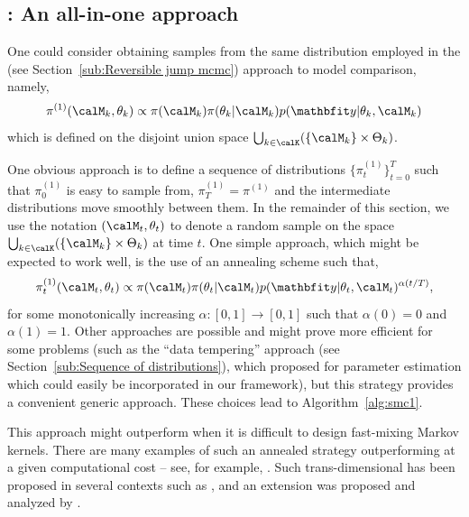 \subsection[SMC1: An all-in-on approach]{\smc[1]: An all-in-one approach}
\label{sub:smc1: An all-in-one approach}

One could consider obtaining samples from the same distribution employed in
the \rjmcmc (see Section~\ref{sub:Reversible jump mcmc}) approach to model
comparison, namely,
\begin{equation}
  \pi^{(1)}(\calM_k,\theta_k) \propto
  \pi(\calM_k)\pi(\theta_k|\calM_k)p(\data|\theta_k,\calM_k)
\end{equation}
which is defined on the disjoint union space
$\bigcup_{k\in\calK}(\{\calM_k\}\times\Theta_k)$.

One obvious \smc approach is to define a sequence of distributions
$\{\pi_t^{(1)}\}_{t=0}^T$ such that $\pi^{(1)}_0$ is easy to sample from,
$\pi_{T}^{(1)} = \pi^{(1)}$ and the intermediate distributions move smoothly
between them. In the remainder of this section, we use the notation
$(\calM_t,\theta_t)$ to denote a random sample on the space
$\bigcup_{k\in\calK}(\{\calM_k\}\times\Theta_k)$ at time $t$. One simple
approach, which might be expected to work well, is the use of an annealing
scheme such that,
\begin{equation}
  \pi^{(1)}_t(\calM_t,\theta_t) \propto \pi(\calM_t)\pi(\theta_t|\calM_t)
  p(\data|\theta_t,\calM_t)^{\alpha(t/T)},
  \label{eq:geometry_1}
\end{equation}
for some monotonically increasing $\alpha:[0,1]\to[0,1]$ such that $\alpha(0)
= 0$ and $\alpha(1) = 1$. Other approaches are possible and might prove more
efficient for some problems (such as the ``data tempering'' approach (see
Section~\ref{sub:Sequence of distributions}), which \cite{Chopin:2002hg}
proposed for parameter estimation which could easily be incorporated in our
framework), but this strategy provides a convenient generic approach. These
choices lead to Algorithm~\ref{alg:smc1}.



This approach might outperform \rjmcmc when it is difficult to design
fast-mixing Markov kernels. There are many examples of such an annealed \smc
strategy outperforming \mcmc at a given computational cost -- see, for
example, \cite{Fan:2008tf,Johansen:2008kp,Fearnhead:2010ua}. Such
trans-dimensional \smc has been proposed in several contexts such as
\cite{Peters:2005wh}, and an extension was proposed and analyzed by
\cite{Jasra:2008bb}.

